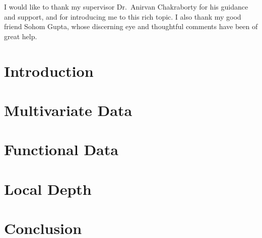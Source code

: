 \documentclass[12pt]{report}
\begin{document}
    I would like to thank my supervisor Dr.~Anirvan Chakraborty for his
    guidance and support, and for introducing me to this rich topic.
    I also thank my good friend Sohom Gupta, whose discerning eye and
    thoughtful comments have been of great help.


    \tableofcontents


    \chapter{Introduction}
    \label{chap:introduction}
    


    \chapter{Multivariate Data}
    \label{chap:multivariate}
    


    \chapter{Functional Data}
    \label{chap:functional}
    


    \chapter{Local Depth}
    \label{chap:localdepth}
    


    \chapter{Conclusion}
    


    \printbibliography

    \appendix
\end{document}
